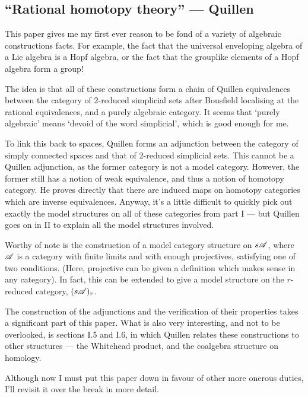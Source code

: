 \documentclass[11pt]{article}
\newcommand{\KanSemResponse}[1]
{
\thispagestyle{fancy}
\subsection*{#1}
}
\begin{document}
\begin{RationalHomotopyQuillen}
\KanSemResponse
{``Rational homotopy theory'' --- Quillen}
This paper gives me my first ever reason to be fond of a variety of algebraic constructions facts. For example, the fact that the universal enveloping algebra of a Lie algebra is a Hopf algebra, or the fact that the grouplike elements of a Hopf algebra form a group!

The idea is that all of these constructions form a chain of Quillen equivalences between the category of 2-reduced simplicial sets after Bousfield localising at the rational equivalences, and a purely algebraic category. It seems that `purely algebraic' means `devoid of the word simplicial', which is good enough for me.

To link this back to spaces, Quillen forms an adjunction between the category of simply connected spaces and that of 2-reduced simplicial sets. This cannot be a Quillen adjunction, as the former category is not a model category. However, the former still has a notion of weak equivalence, and thus a notion of homotopy category. He proves directly that there are induced maps on homotopy categories which are inverse equivalences. Anyway, it's a little difficult to quickly pick out exactly the model structures on all of these categories from part I --- but Quillen goes on in II to explain all the model structures involved.

Worthy of note is the construction of a model category structure on $s\mathscr{A}$, where $\mathscr{A}$ is a category with finite limits and with enough projectives, satisfying one of two conditions. (Here, projective can be given a definition which makes sense in any category). In fact, this can be extended to give a model structure on the $r$-reduced category, $(s\mathscr{A})_r$.

The construction of the adjunctions and the verification of their properties takes a significant part of this paper. What is also very interesting, and not to be overlooked, is sections I.5 and I.6, in which Quillen relates these constructions to other structures ---  the Whitehead product, and the coalgebra structure on homology.

Although now I must put this paper down in favour of other more onerous duties, I'll revisit it over the break in more detail.



\pagebreak
\end{RationalHomotopyQuillen}
\end{document}
